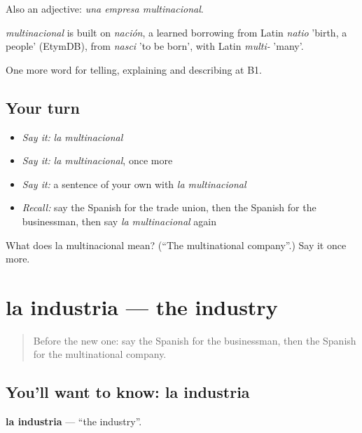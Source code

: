 Also an adjective: \emph{una empresa multinacional}.

\begin{cousinweb}
\emph{multinacional} is built on \emph{nación}, a learned borrowing from Latin \emph{natio} 'birth, a people' (EtymDB), from \emph{nasci} 'to be born', with Latin \emph{multi-} 'many'.
\end{cousinweb}

\begin{grammarlens}[title={What you've built}]
One more word for telling, explaining and describing at B1.
\end{grammarlens}

\subsection*{Your turn}
\begin{itemize}
\raggedright
  \item \emph{Say it:} \emph{la multinacional}
  \item \emph{Say it:} \emph{la multinacional}, once more
  \item \emph{Say it:} a sentence of your own with \emph{la multinacional}
  \item \emph{Recall:} say the Spanish for the trade union, then the Spanish for the businessman, then say \emph{la multinacional} again
\end{itemize}

\begin{tcolorbox}[breakable,colback=teal!4,colframe=teal!35!black,title={Before you move on}]
What does la multinacional mean? (\textquotedblleft{}The multinational company\textquotedblright{}.) Say it once more.
\end{tcolorbox}
\section[la industria]{la industria — the industry}

\label{lesson:ES-C592-industria}



\begin{quote}
Before the new one: say the Spanish for the businessman, then the Spanish for the multinational company.
\end{quote}

\subsection*{You'll want to know: la industria}
\textbf{la industria} — \textquotedblleft{}the industry\textquotedblright{}.

